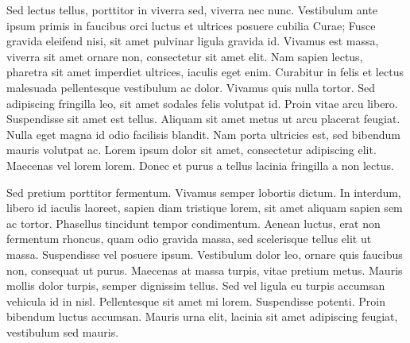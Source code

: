 Sed lectus tellus, porttitor in viverra sed, viverra nec
nunc. Vestibulum ante ipsum primis in faucibus orci luctus et ultrices
posuere cubilia Curae; Fusce gravida eleifend nisi, sit amet pulvinar
ligula gravida id. Vivamus est massa, viverra sit amet ornare non,
consectetur sit amet elit. Nam sapien lectus, pharetra sit amet
imperdiet ultrices, iaculis eget enim. Curabitur in felis et lectus
malesuada pellentesque vestibulum ac dolor. Vivamus quis nulla
tortor. Sed adipiscing fringilla leo, sit amet sodales felis volutpat
id. Proin vitae arcu libero. Suspendisse sit amet est tellus. Aliquam
sit amet metus ut arcu placerat feugiat. Nulla eget magna id odio
facilisis blandit. Nam porta ultricies est, sed bibendum mauris
volutpat ac. Lorem ipsum dolor sit amet, consectetur adipiscing
elit. Maecenas vel lorem lorem. Donec et purus a tellus lacinia
fringilla a non lectus.

Sed pretium porttitor fermentum. Vivamus semper lobortis dictum. In
interdum, libero id iaculis laoreet, sapien diam tristique lorem, sit
amet aliquam sapien sem ac tortor. Phasellus tincidunt tempor
condimentum. Aenean luctus, erat non fermentum rhoncus, quam odio
gravida massa, sed scelerisque tellus elit ut massa. Suspendisse vel
posuere ipsum. Vestibulum dolor leo, ornare quis faucibus non,
consequat ut purus. Maecenas at massa turpis, vitae pretium
metus. Mauris mollis dolor turpis, semper dignissim tellus. Sed vel
ligula eu turpis accumsan vehicula id in nisl. Pellentesque sit amet
mi lorem. Suspendisse potenti. Proin bibendum luctus accumsan. Mauris
urna elit, lacinia sit amet adipiscing feugiat, vestibulum sed mauris.
